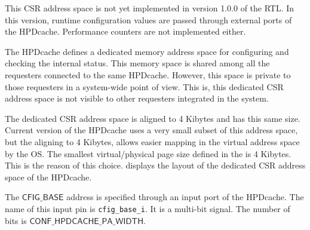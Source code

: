 \documentclass[10pt,titlepage,twoside]{book}
\begin{document}
\begin{tcolorbox}[colback=red!10!white,
                  colframe=white!10!red,
                  title=\textbf{Important},
                  center, valign=top, halign=left,
                  center title,
                  width=.950\linewidth]
This CSR address space is not yet implemented in version 1.0.0 of the RTL.
In this version, runtime configuration values are passed through external ports of the HPDcache.
Performance counters are not implemented either.
\end{tcolorbox}

The \ac{HPDcache} defines a dedicated memory address space for configuring and checking the internal status.
This memory space is shared among all the requesters connected to the same \ac{HPDcache}.
However, this space is private to those requesters in a system-wide point of view.
This is, this dedicated \ac{CSR} address space is not visible to other requesters integrated in the system.

The dedicated \ac{CSR} address space is aligned to 4 Kibytes and has this same size.
Current version of the \ac{HPDcache} uses a very small subset of this address space, but the aligning to 4 Kibytes, allows easier mapping in the virtual address space by the \ac{OS}.
The smallest virtual/physical page size defined in the \cite{RISCV_privileged_spec} is 4 Kibytes.
This is the reason of this choice.
 displays the layout of the dedicated \ac{CSR} address space of the \ac{HPDcache}.

The $\mathsf{CFIG\_BASE}$ address is specified through an input port of the \ac{HPDcache}.
The name of this input pin is \lstinline{cfig_base_i}.
It is a multi-bit signal.
The number of bits is $\mathsf{CONF\_HPDCACHE\_PA\_WIDTH}$.
\end{document}

